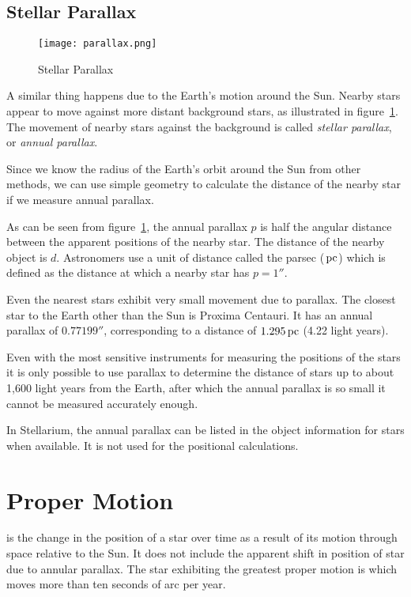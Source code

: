 \subsection{Stellar Parallax}
\label{sec:Concepts:StellarParallax}

\begin{figure}[tb]
\centering\texttt{[image: parallax.png]}
\caption{Stellar Parallax}
\label{fig:Parallax}
\end{figure}

A similar thing happens due to the Earth's motion around the Sun. Nearby
stars appear to move against more distant background stars, as
illustrated in figure~\ref{fig:Parallax}.
The movement of nearby stars against the background is called
\emph{stellar parallax}, or \emph{annual parallax}.

Since we know the radius of the Earth's orbit around the
Sun from other methods, we can use simple geometry to calculate the
distance of the nearby star if we measure annual parallax.

As can be seen from figure~\ref{fig:Parallax}, the annual
parallax $p$ is half the angular distance between the apparent positions
of the nearby star. The distance of the nearby object is $d$. Astronomers
use a unit of distance called the parsec ($\pc$) which is defined as the
distance at which a nearby star has $p=1''$.

Even the nearest stars exhibit very small movement due to
parallax. The closest star to the Earth other than the Sun is Proxima
Centauri. It has an annual parallax of $0.77199''$, corresponding to a
distance of $1.295\pc$ (4.22 light years).

Even with the most sensitive instruments for measuring the positions of
the stars it is only possible to use parallax to determine the distance
of stars up to about 1,600 light years from the Earth, after which the
annual parallax is so small it cannot be measured accurately enough.

In Stellarium, the annual parallax can be listed in the object information for stars
when available. It is not used for the positional calculations.

\section{Proper Motion}
\label{sec:Concepts:ProperMotion}

 is the change in the position of a star over time as a
result of its motion through space relative to the Sun. It does not
include the apparent shift in position of star due to annular parallax.
The star exhibiting the greatest proper motion is  which
moves more than ten seconds of arc per year.

